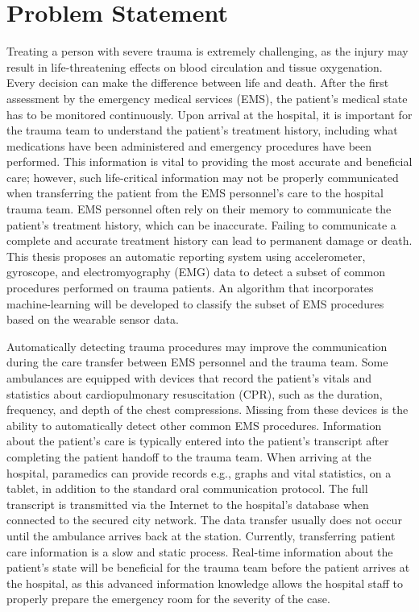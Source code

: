 
\chapter{Problem Statement}
\label{ch:Problem-Statement}

Treating a person with severe trauma is extremely challenging, as the injury may result in life-threatening effects on blood circulation and tissue oxygenation. Every decision can make the difference between life and death. After the first assessment by the emergency medical services (\gls{EMS}), the patient's medical state has to be monitored continuously. Upon arrival at the hospital, it is important for the trauma team to understand the patient's treatment history, including what medications have been administered and emergency procedures have been performed. This information is vital to providing the most accurate and beneficial care; however, such life-critical information may not be properly communicated when transferring the patient from the \gls{EMS} personnel's care to the hospital trauma team. \gls{EMS} personnel often rely on their memory to communicate the patient's treatment history, which can be inaccurate. Failing to communicate a complete and accurate treatment history can lead to permanent damage or death. This thesis proposes an automatic reporting system using accelerometer, gyroscope, and electromyography (\gls{EMG}) data to detect a subset of common procedures performed on trauma patients. An algorithm that incorporates machine-learning will be developed to classify the subset of \gls{EMS} procedures based on the wearable sensor data.
\par Automatically detecting trauma procedures may improve the communication during the care transfer between EMS personnel and the trauma team. Some ambulances are equipped with devices that record the patient's vitals and statistics about cardiopulmonary resuscitation (\gls{CPR}), such as the duration, frequency, and depth of the chest compressions. Missing from these devices is the ability to automatically detect other common EMS procedures. Information about the patient's care is typically entered into the patient's transcript after completing the patient handoff to the trauma team. When arriving at the hospital, paramedics can provide records e.g., graphs and vital statistics, on a tablet, in addition to the standard oral communication protocol. The full transcript is transmitted via the Internet to the hospital's database when connected to the secured city network. The data transfer usually does not occur until the ambulance arrives back at the station. Currently, transferring patient care information is a slow and static process. Real-time information about the patient's state will be beneficial for the trauma team before the patient arrives at the hospital, as this advanced information knowledge allows the hospital staff to properly prepare the emergency room for the severity of the case.
